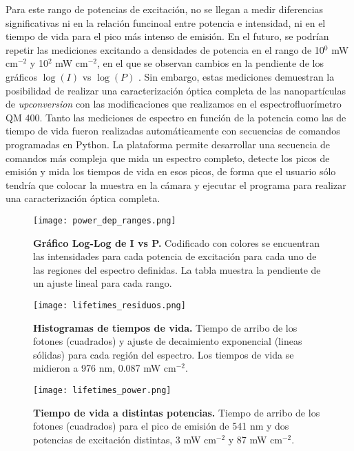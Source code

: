 Para este rango de potencias de excitación, no se llegan a medir diferencias significativas ni en la relación funcinoal entre potencia e intensidad, ni en el tiempo de vida para el pico más intenso de emisión.
En el futuro, se podrían repetir las mediciones excitando a densidades de potencia en el rango de 10$^0$ mW cm$^{-2}$ y 10$^2$ mW cm$^{-2}$, en el que se observan cambios en la pendiente de los gráficos $\log(I)$ vs $\log(P)$ \cite{bujjamer_luminescent_2020}.
Sin embargo, estas mediciones demuestran la posibilidad de realizar una caracterización óptica completa de las nanopartículas de \textit{upconversion} con las modificaciones que realizamos en el espectrofluorímetro QM 400.
Tanto las mediciones de espectro en función de la potencia como las de tiempo de vida fueron realizadas automáticamente con secuencias de comandos programadas en Python.
La plataforma permite desarrollar una secuencia de comandos más compleja que mida un espectro completo, detecte los picos de emisión y mida los tiempos de vida en esos picos, de forma que el usuario sólo tendría que colocar la muestra en la cámara y ejecutar el programa para realizar una caracterización óptica completa.

\begin{figure}
    \centering
    \texttt{[image: power\_dep\_ranges.png]}
    \caption{\textbf{Gráfico Log-Log de I vs P.} Codificado con colores se encuentran las intensidades para cada potencia de excitación para cada uno de las regiones del espectro definidas. La tabla muestra la pendiente de un ajuste lineal para cada rango.}
    \label{fig:power_dep_ranges}
\end{figure}


\begin{figure}
    \centering
    \texttt{[image: lifetimes\_residuos.png]}
    \caption{\textbf{Histogramas de tiempos de vida.} Tiempo de arribo de los fotones (cuadrados) y ajuste de decaimiento exponencial (lineas sólidas) para cada región del espectro. Los tiempos de vida se midieron a 976 nm, 0.087 mW cm$^{-2}$.}
    \label{fig:lifetimes}
\end{figure}

\begin{SCfigure}
    \centering
    \texttt{[image: lifetimes\_power.png]}
    \caption{\textbf{Tiempo de vida a distintas potencias.} Tiempo de arribo de los fotones (cuadrados) para el pico de emisión de 541 nm y dos potencias de excitación distintas, 3 mW cm$^{-2}$ y 87 mW cm$^{-2}$.}
    \label{fig:lifetimes_power}
\end{SCfigure}
